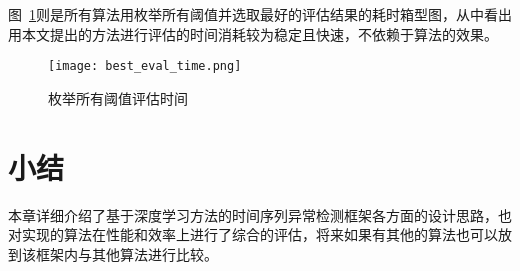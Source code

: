 图~\ref{fig:eval:time}则是所有算法用枚举所有阈值并选取最好的评估结果的耗时箱型图，从中看出用本文提出的方法进行评估的时间消耗较为稳定且快速，不依赖于算法的效果。

\begin{figure}[htbp]
  \centering
  \texttt{[image: best\_eval\_time.png]}
  \caption{枚举所有阈值评估时间}
  \label{fig:eval:time}
\end{figure}

\section{小结}
本章详细介绍了基于深度学习方法的时间序列异常检测框架各方面的设计思路，也对实现的算法在性能和效率上进行了综合的评估，将来如果有其他的算法也可以放到该框架内与其他算法进行比较。


